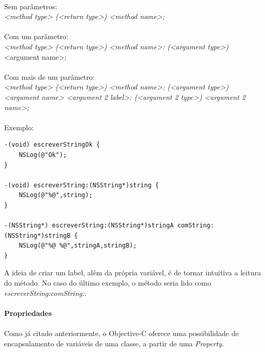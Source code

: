 \documentclass[a4paper,12pt,brazil,doubleside]{book}
\begin{document}
\paragraph{}Sem parâmetros:\\
\emph{<method type> (<return type>) <method name>;}\\

\paragraph{}Com um parâmetro:\\
\emph{<method type> (<return type>) <method name>: (<argument type>)} <argument name>;\\

\paragraph{}Com mais de um parâmetro:\\
\emph{<method type> (<return type>) <method name>: (<argument type>) <argument name> <argument 2 label>: (<argument 2 type>) <argument 2 name>;}\\

\paragraph{}Exemplo:

\begin{lstlisting}
-(void) escreverStringOk {
	NSLog(@"Ok");
}

-(void) escreverString:(NSString*)string {
	NSLog(@"%@",string);
}

-(NSString*) escreverString:(NSString*)stringA comString:(NSString*)stringB {
	NSLog(@"%@ %@",stringA,stringB);
}
\end{lstlisting}

\bigskip

A ideia de criar um label, além da própria variável, é de tornar intuitiva a leitura do método. No caso do último exemplo, o método seria lido como \emph{escreverString:comString:}.

\bigskip

\paragraph{}\textbf{Propriedades}

\paragraph{}Como já citado anteriormente, o Objective-C oferece uma possibilidade de encapsulamento de variáveis de uma classe, a partir de uma \textit{Property}.
\end{document}
